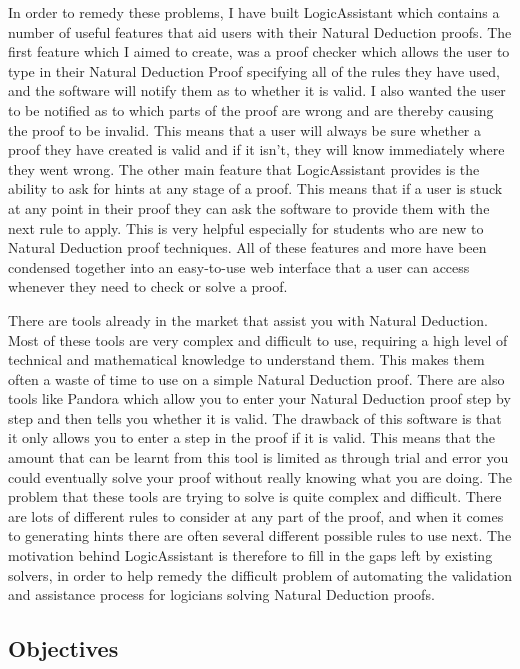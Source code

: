 In order to remedy these problems, I have built LogicAssistant which contains a number of useful features that aid users with their Natural Deduction proofs. The first feature which I aimed to create, was a proof checker which allows the user to type in their Natural Deduction Proof specifying all of the rules they have used, and the software will notify them as to whether it is valid. I also wanted the user to be notified as to which parts of the proof are wrong and are thereby causing the proof to be invalid. This means that a user will always be sure whether a proof they have created is valid and if it isn't, they will know immediately where they went wrong. The other main feature that LogicAssistant provides is the ability to ask for hints at any stage of a proof. This means that if a user is stuck at any point in their proof they can ask the software to provide them with the next rule to apply. This is very helpful especially for students who are new to Natural Deduction proof techniques. All of these features and more have been condensed together into an easy-to-use web interface that a user can access whenever they need to check or solve a proof. 

There are tools already in the market that assist you with Natural Deduction. Most of these tools are very complex and difficult to use, requiring a high level of technical and mathematical knowledge to understand them. This makes them often a waste of time to use on a simple Natural Deduction proof. There are also tools like Pandora\cite{pandora} which allow you to enter your Natural Deduction proof step by step and then tells you whether it is valid. The drawback of this software is that it only allows you to enter a step in the proof if it is valid. This means that the amount that can be learnt from this tool is limited as through trial and error you could eventually solve your proof without really knowing what you are doing. The problem that these tools are trying to solve is quite complex and difficult. There are lots of different rules to consider at any part of the proof, and when it comes to generating hints there are often several different possible rules to use next. The motivation behind LogicAssistant is therefore to fill in the gaps left by existing solvers, in order to help remedy the difficult problem of automating the validation and assistance process for logicians solving Natural Deduction proofs.

\subsection{Objectives \label{objectives}}

